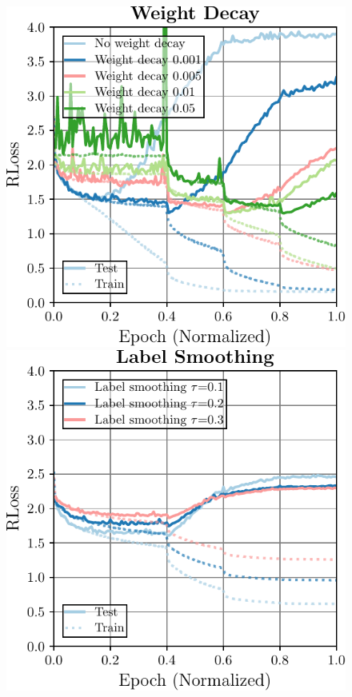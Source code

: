 \begin{figure}[t]
	\centering
	\begin{minipage}[t]{0.23\textwidth}
		\includegraphics[width=\textwidth]{plots_supp_understanding_ablation_wd}
	\end{minipage}
	\begin{minipage}[t]{0.23\textwidth}
		\includegraphics[width=\textwidth]{plots_supp_understanding_ablation_ls}

\end{minipage}
\end{figure}
